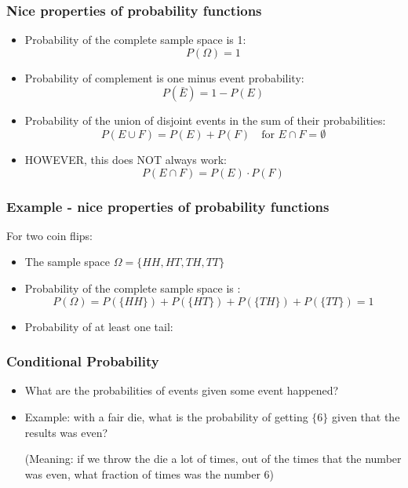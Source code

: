 \documentclass{beamer}
\begin{document}


\begin{frame}
\frametitle{Nice properties of probability functions}
\begin{itemize}
\item Probability of the complete sample space is 1:
$$ P(\Omega)=1 $$
\item Probability of complement is one minus event probability:
$$ P(\bar{E})=1-P(E) $$
\item Probability of the union of disjoint events in the sum of their probabilities:
$$ P(E \cup F)=P(E)+P(F) \quad \text{for } E \cap F = \emptyset $$
\item HOWEVER, this does NOT always work:
$$ P(E \cap F)=P(E) \cdot P(F)$$
\end{itemize}
\end{frame}


\begin{frame}
\frametitle{Example - nice properties of probability functions}
For two coin flips:
\begin{itemize}
\item The sample space $\Omega=\{HH,HT,TH,TT\}$
\item Probability of the complete sample space is :
$$ P(\Omega)=P(\{HH\})+P(\{HT\})+P(\{TH\})+P(\{TT\})=1 $$
\item Probability of at least one tail:
\end{itemize}
\end{frame}


\begin{frame}
\frametitle{Conditional Probability}
\begin{itemize}
\item What are the probabilities of events given some event happened?
\item Example: with a fair die, what is the probability of getting $\{6\}$ given that the results was even?

(Meaning: if we throw the die a lot of times, out of the times that the number was even, what fraction of times was the number 6)

\end{itemize}
\end{frame}

\end{document}
